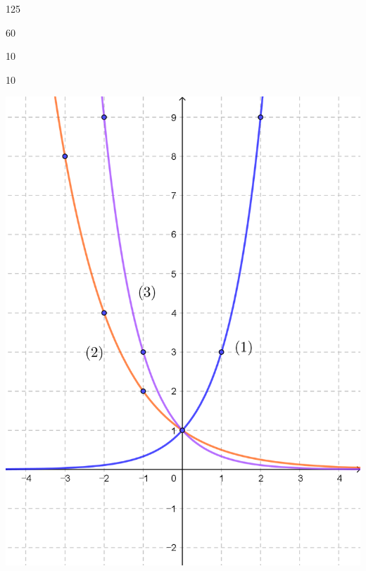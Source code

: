 \documentclass{oblivoir}
\begin{document}
\begin{multicols*}{2}
%
\begin{enumerate*}[itemjoin=\quad]
\item
125
\item
60
\item
10
\item
10
\end{enumerate*}

\columnbreak
%
\begin{center}
\includegraphics[width=0.8\columnwidth]{exp_2}
\end{center}


\end{multicols*}
\end{document}
